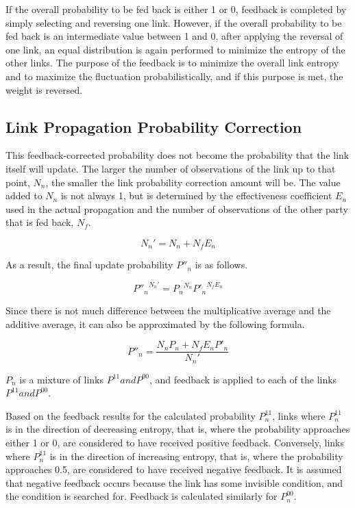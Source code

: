 \documentclass[12pt]{article}
\begin{document}
If the overall probability to be fed back is either 1 or 0, feedback is
completed by simply selecting and reversing one link. However, if the
overall probability to be fed back is an intermediate value between 1
and 0, after applying the reversal of one link, an equal distribution is
again performed to minimize the entropy of the other links. The purpose
of the feedback is to minimize the overall link entropy and to maximize
the fluctuation probabilistically, and if this purpose is met, the
weight is reversed.

\subsection{Link Propagation Probability Correction}\label{link-propagation-probability-correction}

This feedback-corrected probability does not become the probability that
the link itself will update. The larger the number of observations of
the link up to that point, \(N_n\), the smaller the link probability
correction amount will be. The value added to \(N_n\) is not always 1,
but is determined by the effectiveness coefficient \(E_n\) used in the
actual propagation and the number of observations of the other party
that is fed back, \(N_f\).

\[ N_n'=N_n+N_fE_n\]

As a result, the final update probability \(P''_n\) is as follows.

\[ {P''_n}^{N_n'}={P_n}^{N_n} {P'_n}^{N_fE_n}\]

Since there is not much difference between the multiplicative average
and the additive average, it can also be approximated by the following
formula.

\[ P''_n=\frac{N_nP_n +N_fE_nP'_n}{N_{n}'}\]

\(P_n\) is a mixture of links \(P^{11} and P^{00}\), and feedback is
applied to each of the links \(P^{11} and P^{00}\).

Based on the feedback results for the calculated probability
\(P^{11}_ n\), links where \(P^{11}_n\) is in the direction of
decreasing entropy, that is, where the probability approaches either 1
or 0, are considered to have received positive feedback. Conversely,
links where \(P^{11}_n\) is in the direction of increasing entropy, that
is, where the probability approaches 0.5, are considered to have
received negative feedback. It is assumed that negative feedback occurs
because the link has some invisible condition, and the condition is
searched for. Feedback is calculated similarly for \(P^{00}_n\).
\end{document}
